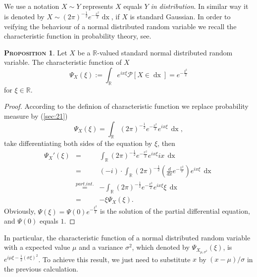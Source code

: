 \documentclass[a4paper, twoside, 11pt]{article}
\theoremstyle{definition}
\newtheorem{proposition}[definition]{\scshape Proposition}
\newcommand{\sqbr}[1]{\left[ {#1} \right]}
\begin{document}
We use a notation $X \sim Y$ represents $X$ equals $Y$ \emph{in distribution}. In similar way it is denoted by $X \sim (2\pi)^{-\frac{1}{2}}e^{-\frac{x^2}{2}}\mathop{dx} $, if $X$ is standard Gaussian. In order to veifying the behaviour of a normal distributed random variable we recall the characteristic function in probability theory, see\cite{bauer}. 

\begin{proposition}
  Let $X$ be a $\mathbb{R}$-valued standard normal distributed random variable. The characteristic function of $X$
\begin{equation}
  \Psi_X(\xi) := \int_\mathbb{R} e^{ix\xi}\mathcal{P}\sqbr{X \in \mathop{dx}} = e^{-\frac{\xi^2}{2}}
  \label{sec:cht}
\end{equation}
for $\xi \in \mathbb{R}$.
\end{proposition}
\begin{proof}
  According to the definion of characteristic function we replace probability measure by (\ref{sec:21})
  \begin{equation*}
	\Psi_X(\xi) = \int_\mathbb{R} (2\pi)^{-\frac{1}{2}}e^{-\frac{x^2}{2}}e^{ix\xi}\,\mathop{dx},
  \end{equation*}
take differentiating both sides of the equation by $\xi$, then
\begin{eqnarray*}
\Psi_X'(\xi) &=& \int_\mathbb{R}(2\pi)^{-\frac{1}{2}}e^{-\frac{x^2}{2}}e^{ix\xi}ix\,\mathop{dx}\\
             &=& (-i)\cdot\int_\mathbb{R} (2\pi)^{-\frac{1}{2}}(\frac{d}{dx}e^{-\frac{x^2}{2}})e^{ix\xi}\,\mathop{dx}\\
			 &\overset{part.int.}{=}& -\int_\mathbb{R}(2\pi)^{-\frac{1}{2}}e^{-\frac{x^2}{2}}e^{ix\xi}\xi\,\mathop{dx}\\
			 &=& -\xi\Psi_X(\xi).
\end{eqnarray*}
Obviously, 
$\Psi(\xi) = \Psi(0)e^{-\frac{\xi^2}{2}}$ is the solution of the partial differential equation, and $\Psi(0)$ equals $1$.
\end{proof}

In particular, the characteristic function of a normal distributed random variable with a expected value $\mu$ and a variance $\sigma^2$, which denoted by $\Psi_{X_{\mu,\sigma^2}}(\xi)$, is $e^{i\mu\xi-\frac{1}{2}(\sigma\xi)^2}$. To achieve this result, we just need to substitute $x$ by $(x-\mu)/\sigma$ in the previous calculation. 
\end{document}
